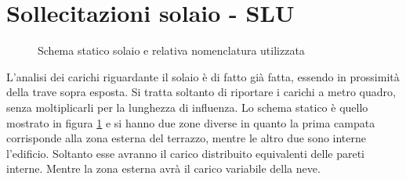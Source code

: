 		

\clearpage
\section{Sollecitazioni solaio - SLU}
\begin{figure}[htb]
	\centering
	\caption{Schema statico solaio e relativa nomenclatura utilizzata}
	\label{fig:schema_statico_solaio}
	\end{figure}
L'analisi dei carichi riguardante il solaio è di fatto già fatta, essendo in prossimità della trave sopra esposta.
Si tratta soltanto di riportare i carichi a metro quadro, senza moltiplicarli per la lunghezza di influenza.
Lo schema statico è quello mostrato in figura \ref{fig:schema_statico_solaio} e si hanno due zone diverse in quanto la prima campata corrisponde alla zona esterna del terrazzo, mentre le altro due sono interne l'edificio.
Soltanto esse avranno il carico distribuito equivalenti delle pareti interne.
Mentre la zona esterna avrà il carico variabile della neve.

